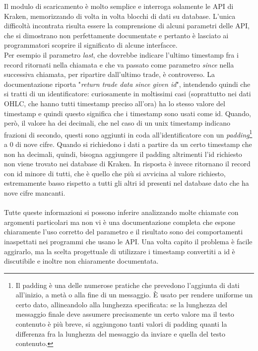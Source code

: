 \documentclass[a4paper,12pt]{report}
\begin{document}
Il modulo di scaricamento è molto semplice e interroga solamente le API di Kraken, memorizzando di volta in volta blocchi di dati su database. L'unica difficoltà incontrata risulta essere la comprensione di alcuni parametri delle API, che si dimostrano non perfettamente documentate e pertanto è lasciato ai programmatori scoprire il significato di alcune interfacce.\\
Per esempio il parametro \textit{last}, che dovrebbe indicare l'ultimo timestamp fra i record ritornati nella chiamata e che va passato come parametro \textit{since} nella successiva chiamata, per ripartire dall'ultimo trade, è controverso. La documentazione riporta "\textit{return trade data since given id}", intendendo quindi che si tratti di un identificatore: curiosamente in moltissimi casi (soprattutto nei dati OHLC, che hanno tutti timestamp preciso all'ora) ha lo stesso valore del timestamp e quindi questo significa che i timestamp sono usati come id. Quando, però, il valore ha dei decimali, che nel caso di un unix timestamp indicano frazioni di secondo, questi sono aggiunti in coda all'identificatore con un \textit{padding}\footnote{Il padding è una delle numerose pratiche che prevedono l'aggiunta di dati all'inizio, a metà o alla fine di un messaggio. È usato per rendere uniforme un certo dato, allineandolo alla lunghezza specificata: se la lunghezza del messaggio finale deve assumere precisamente un certo valore ma il testo contenuto è più breve, si aggiungono tanti valori di padding quanti la differenza fra la lunghezza del messaggio da inviare e quella del testo contenuto.} a 0 di nove cifre. Quando si richiedono i dati a partire da un certo timestamp che non ha decimali, quindi, bisogna aggiungere il padding altrimenti l'id richiesto non viene trovato nei database di Kraken. In risposta è invece ritornano il record con id minore di tutti, che è quello che più si avvicina al valore richiesto, estremamente basso rispetto a tutti gli altri id presenti nel database dato che ha nove cifre mancanti.\\~\\
Tutte queste informazioni si possono inferire analizzando molte chiamate con argomenti particolari ma non vi è una documentazione completa che espone chiaramente l'uso corretto del parametro e il risultato sono dei comportamenti inaspettati nei programmi che usano le API. Una volta capito il problema è facile aggirarlo, ma la scelta progettuale di utilizzare i timestamp convertiti a id è discutibile e inoltre non chiaramente documentata.
\end{document}
